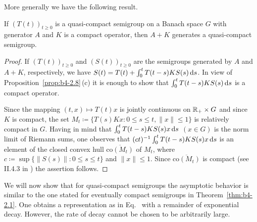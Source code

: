 More generally we have the following result.
\begin{proposition}\label{prop:b4-2.9}
    If\/ $(T(t))_{t \geq 0}$ is a quasi-compact semigroup on a Banach space $G$ with generator $A$ and $K$ is a compact operator, then $A + K$ generates a quasi-compact semigroup.
\end{proposition}
\begin{proof}
	If\/ $(T(t))_{t \geq 0}$ and $(S(t))_{t \geq 0}$ are the semigroups generated by $A$ and $A + K$, respectively, we have $S(t) = T(t) + \int_0^t T(t-s)KS(s)  \mathop{}\!\mathrm{d}{s} $.
	In view of Proposition~\ref{prop:b4-2.8}\,(c) it is enough to show that $\int_0^t T(t-s)KS(s)  \mathop{}\!\mathrm{d}{s} $ is a compact operator.
	
	Since the mapping $(t,x) \mapsto T(t)x$ is jointly continuous on $\mathbb{R}_+ \times G$ and since $K$ is compact, the set $M_t \coloneq \{T(s)Kx \colon 0 \leq s \leq t, \|x\| \leq 1\}$ is relatively compact in $G$. Having in mind that $\int_0^t T(t-s)KS(s)x  \mathop{}\!\mathrm{d}{s} $ $(x \in G)$ is the norm limit of Riemann sums, one observes that 
	$(ct)^{-1}\int_0^t T(t-s)KS(s)x  \mathop{}\!\mathrm{d}{s} $ is an element of the closed convex hull
	 $\overline{\mathrm{co}(M_t)}$ of\/ $M_t$, where $c \coloneq \sup \{\|S(s)\| \colon 0 \leq s \leq t\}$ and $\|x\| \leq 1$. Since $\overline{\mathrm{co}(M_t)}$ is compact (see II.4.3 in \textcite{schaefer:1966}) the assertion follows.
\end{proof}
We will now show that for quasi-compact semigroups the asymptotic behavior is similar to the one stated for eventually compact semigroups in Theorem~\ref{thm:b4-2.1}. 
One obtains a representation as in Eq.~ with a remainder of exponential decay. 
However, the rate of decay cannot be chosen to be arbitrarily large.

